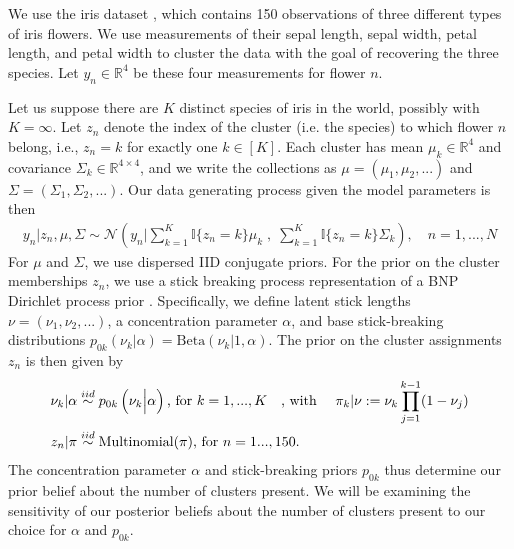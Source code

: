 We use the iris dataset \citep{iris_data_anderson, iris_data_fisher}, which
contains 150 observations of three different types of iris flowers. We use
measurements of their sepal length, sepal width, petal length, and petal width
to cluster the data with the goal of recovering the three species. Let $y_{n}\in
\mathbb{R}^4$ be these four measurements for flower $n$.

Let us suppose there are $K$ distinct species of iris in the world, possibly
with $K=\infty$. Let $z_n$ denote the index of the cluster (i.e. the species) to
which flower $n$ belong, i.e., $z_n = k$ for exactly one $k\in [K]$. Each
cluster has mean $\mu_k\in \mathbb{R}^4$ and covariance $\Sigma_k \in
\mathbb{R}^{4\times 4}$, and we write the collections as $\mu = \left(\mu_1,
\mu_2, ...\right)$ and $\Sigma = \left(\Sigma_1, \Sigma_2, ... \right)$. Our
data generating process given the model parameters is then
%
\begin{align*}
	y_n | z_n, \mu, \Sigma \sim
        \mathcal{N}\left(
            y_n \Big\vert
                \sum_{k=1}^K \mathbb{I}\{z_n = k\} \mu_k \;,
              \; \sum_{k=1}^K \mathbb{I}\{z_n = k\} \Sigma_k\right),
	\quad n = 1, ..., N
\end{align*}
%
For $\mu$ and $\Sigma$, we use dispersed IID conjugate priors.
%
%
For the prior on the cluster memberships $z_n$, we use a stick breaking
process representation of a BNP Dirichlet process prior
\citep{ferguson:1973:bayesian, sethuraman:1994:constructivedp}. Specifically, we
define latent stick lengths $\nu=\left(\nu_1, \nu_2, ...\right)$, a
concentration parameter $\alpha$, and base stick-breaking distributions
$p_{0k}\left(\nu_k \vert \alpha \right) = \mathrm{Beta}\left(\nu_k \Big\vert 1,
\alpha \right)$.  The prior on the cluster assignments $z_n$ is then given by
%
\begin{align}
\nu_k \vert \alpha &\stackrel{iid}{\sim}
    p_{0k}\left(\nu_k \Big\vert \alpha\right)\textrm{, for }k=1,...,K
    \quad\textrm{, with }\quad \nonumber
\pi_k | \nu := \nu_k \prod_{j=1}^{k-1} (1 - \nu_j) \label{eq:stick_breaking} \\
z_n \vert \pi &\stackrel{iid}{\sim} \mathrm{Multinomial}(\pi)\textrm{, for }n = 1...,150.
\end{align}
%
The concentration parameter $\alpha$ and stick-breaking priors $p_{0k}$
thus determine our prior belief about the number of clusters present.
We will be examining the sensitivity of our posterior beliefs about the
number of clusters present to our choice for $\alpha$ and $p_{0k}$.

